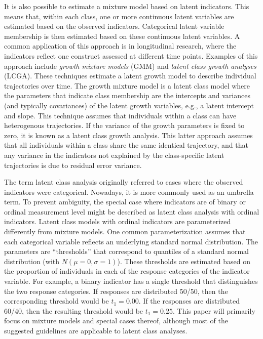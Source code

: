 \documentclass[
  ,man]{apa6}
\begin{document}
It is also possible to estimate a mixture model based on latent indicators.
This means that, within each class, one or more continuous latent variables are estimated based on the observed indicators.
Categorical latent variable membership is then estimated based on these continuous latent variables.
A common application of this approach is in longitudinal research, where the indicators reflect one construct assessed at different time points.
Examples of this approach include \emph{growth mixture models} (GMM) and \emph{latent class growth analyses} (LCGA).
These techniques estimate a latent growth model to describe individual trajectories over time.
The growth mixture model is a latent class model where the parameters that indicate class membership
are the intercepts and variances (and typically covariances) of the latent growth variables, e.g., a latent intercept and slope.
This technique assumes that individuals within a class can have heterogenous trajectories.
If the variance of the growth parameters is fixed to zero, it is known as a latent class growth analysis.
This latter approach assumes that all individuals within a class share the same identical trajectory,
and that any variance in the indicators not explained by the class-specific latent trajectories is due to residual error variance.

The term latent class analysis originally referred to cases where the observed indicators were categorical.
Nowadays, it is more commonly used as an umbrella term.
To prevent ambiguity, the special case where indicators are of binary or ordinal measurement level might be described as latent class analysis with ordinal indicators.
Latent class models with ordinal indicators are parameterized differently from mixture models.
One common parameterization assumes that each categorical variable reflects an underlying standard normal distribution.
The parameters are ``thresholds'' that correspond to quantiles of a standard normal distribution (with \(N(\mu = 0, \sigma = 1)\)).
These thresholds are estimated based on the proportion of individuals in each of the response categories of the indicator variable.
For example, a binary indicator has a single threshold that distinguishes the two response categories.
If responses are distributed 50/50, then the corresponding threshold would be \(t_1 = 0.00\).
If the responses are distributed 60/40, then the resulting threshold would be \(t_1 = 0.25\).
This paper will primarily focus on mixture models and special cases thereof,
although most of the suggested guidelines are applicable to latent class analyses.
\end{document}
